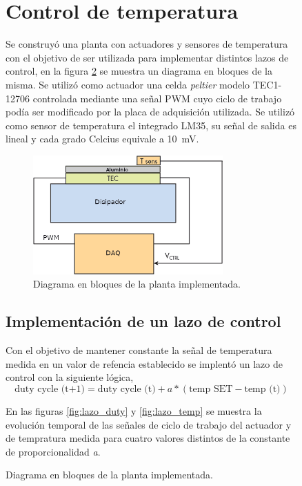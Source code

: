 \documentclass[a4paper,11pt]{article}
\begin{document}
\begin{figure}[!ht]
\clearpage
\section{Control de temperatura}
\label{sec:control_temperatura}

Se construyó una planta con actuadores y sensores de temperatura con el
objetivo de ser utilizada para implementar distintos lazos de control,
en la figura \ref{fig:planta} se muestra un diagrama en bloques de la
misma.  Se utilizó como actuador una celda \emph{peltier} modelo
TEC1-12706 controlada mediante una señal PWM cuyo ciclo de trabajo podía
ser modificado por la placa de adquisición utilizada. Se utilizó como
sensor de temperatura el integrado LM35, su señal de salida es lineal y
cada grado Celcius equivale a \SI{10}{\mV}. 

\begin{figure}[!ht]
\centering
\includegraphics[width=0.8\textwidth]{figs/Planta}
\caption{Diagrama en bloques de la planta implementada.}
\label{fig:planta}
\end{figure}

\subsection{Implementación de un lazo de control}
Con el objetivo de mantener constante la
señal de temperatura medida en un valor de refencia establecido se
implentó un lazo de control con la siguiente lógica,
\begin{equation*}
\text{duty cycle (t+1)} = \text{duty cycle (t)} + a * (\text{temp SET}
- \text{temp (t)})
\end{equation*}

En las figuras \ref{fig:lazo_duty} y \ref{fig:lazo_temp} se muestra la
evolución temporal de las señales de ciclo de trabajo del actuador y de
tempratura medida para cuatro valores distintos de la constante de
proporcionalidad \emph{a}.


\end{figure}
\end{document}
